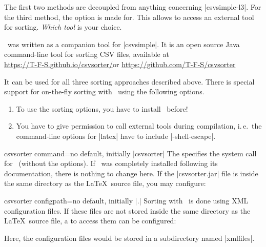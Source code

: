 \documentclass[a4paper,11pt]{ltxdoc}
\begin{document}
The first two methods are decoupled from anything concerning |csvsimple-l3|.
For the third method, the  option is made for.
This allows to access an external tool for sorting.
\emph{Which tool} is your choice.

\csvsorter\ was written as a companion tool for |csvsimple|.
It is an open source Java command-line tool for sorting CSV files, available at\\
\url{https://T-F-S.github.io/csvsorter/}\quad or\quad
\url{https://github.com/T-F-S/csvsorter}

It can be
used for all three sorting approaches described above.
There is special support for on-the-fly sorting with \csvsorter\ using the
following options.

\begin{enumerate}\bfseries
\item To use the sorting options, you have to install \csvsorter\ before!
\item You have to give permission to call external tools during
  compilation, i.\,e.\ the command-line options for |latex| have to include
  |-shell-escape|.
\end{enumerate}

\bigskip

\begin{docCsvKey}{csvsorter command}{=}{no default, initially |csvsorter|}
  The  specifies the system call for \csvsorter\ (without the options).
  If \csvsorter\ was completely installed following its documentation, there is
  nothing to change here. If the |csvsorter.jar| file is inside the same
  directory as the \LaTeX\ source file, you may configure:%
\begin{dispListing}
\end{dispListing}
\end{docCsvKey}

\begin{docCsvKey}{csvsorter configpath}{=}{no default, initially |.|}
  Sorting with \csvsorter\ is done using XML configuration files. If these files
  are not stored inside the same directory as the \LaTeX\ source file, a
   to access them can be configured:
\begin{dispListing}
\end{dispListing}
  Here, the configuration files would be stored in a subdirectory named |xmlfiles|.
\end{docCsvKey}
\end{document}
